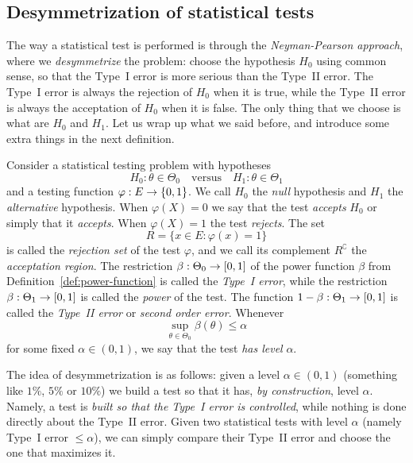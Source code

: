 \subsection{Desymmetrization of statistical tests} %


The way a statistical test is performed is through the \emph{Neyman-Pearson approach}, where we \emph{desymmetrize} the problem: choose the hypothesis $H_0$ using common sense, so that the Type~I error is more serious than the Type~II error.
The Type~I error is always the rejection of $H_0$ when it is true, while the Type~II error is always the acceptation of $H_0$ when it is false.
The only thing that we choose is what are $H_0$ and $H_1$.
Let us wrap up what we said before, and introduce some extra things in the next definition.
\begin{definition}
	\label{def:test-definitions}
	Consider a statistical testing problem with hypotheses
	\begin{equation*}
		H_0 : \theta \in \Theta_0 \quad \text{versus} \quad H_1 : \theta \in \Theta_1
	\end{equation*}
	and a testing function $\varphi : E \rightarrow \{ 0, 1 \}$.
	We call $H_0$ the \emph{null} hypothesis and $H_1$ the \emph{alternative} hypothesis.
	When $\varphi(X) = 0$ we say that the test \emph{accepts} $H_0$ or simply that it \emph{accepts}. When $\varphi(X) = 1$ the test \emph{rejects}.
	The set
	\begin{equation*}
		R = \{ x \in E : \varphi(x) = 1 \}
	\end{equation*}
	is called the \emph{rejection set} of the test $\varphi$, and we call its complement $R^\complement$ the \emph{acceptation region}.
	The restriction $\beta : \Theta_0 \rightarrow [0, 1]$
	of the power function $\beta$ from Definition~\ref{def:power-function} is called the \emph{Type~I error}, while the restriction $\beta : \Theta_1 \rightarrow [0, 1]$
	is called the \emph{power} of the test. The function $1 - \beta : \Theta_1 \rightarrow [0, 1]$ is called the \emph{Type~II error} or \emph{second order error}.
	Whenever
	\begin{equation*}
		\sup_{\theta \in \Theta_0} \beta(\theta) \leq \alpha
	\end{equation*}
	for some fixed $\alpha \in (0, 1)$, we say that the test \emph{has level} $\alpha$.	
\end{definition}
The idea of desymmetrization is as follows: given a level $\alpha \in (0, 1)$ (something like $1\%$, $5\%$ or $10\%$) we build a test so that it has, \emph{by construction}, level $\alpha$.
Namely, a test is \emph{built so that the Type~I error is controlled}, while nothing is done directly about the Type~II error.
Given two statistical tests with level $\alpha$ (namely Type~I error $\leq \alpha$), we can simply compare their Type~II error and choose the one that maximizes it.

